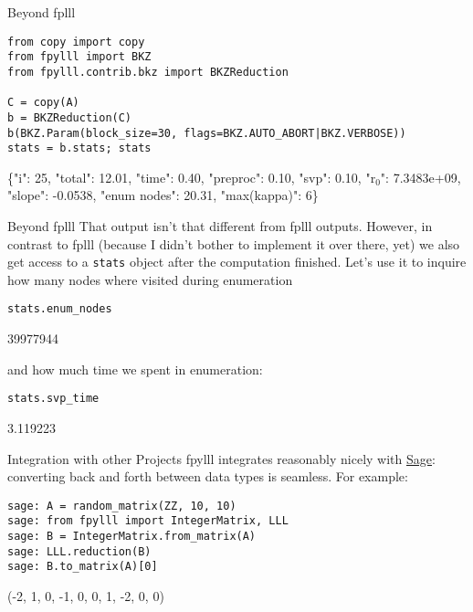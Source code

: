 \documentclass[presentation,smaller]{beamer}
\begin{document}
\begin{frame}[fragile,label={sec:orgheadline24}]{Beyond fplll}
 \lstset{language=Python,label= ,caption= ,captionpos=b,numbers=none}
\begin{lstlisting}
from copy import copy
from fpylll import BKZ
from fpylll.contrib.bkz import BKZReduction

C = copy(A)
b = BKZReduction(C)
b(BKZ.Param(block_size=30, flags=BKZ.AUTO_ABORT|BKZ.VERBOSE))
stats = b.stats; stats
\end{lstlisting}

\{"i":  25,  "total":     12.01,  "time":     0.40,  "preproc":     0.10,  "svp":     0.10,  "r\(_{\text{0}}\)": 7.3483e+09,  "slope": -0.0538,  "enum nodes": 20.31,  "max(kappa)":   6\}
\end{frame}

\begin{frame}[fragile,label={sec:orgheadline25}]{Beyond fplll}
 That output isn’t that different from \alert{fplll} outputs. However, in contrast to \alert{fplll} (because I didn’t bother to implement it over there, yet) we also get access to a \texttt{stats} object after the computation finished. Let’s use it to inquire how many nodes where visited during enumeration

\lstset{language=Python,label= ,caption= ,captionpos=b,numbers=none}
\begin{lstlisting}
stats.enum_nodes
\end{lstlisting}

39977944

and how much time we spent in enumeration:

\lstset{language=Python,label= ,caption= ,captionpos=b,numbers=none}
\begin{lstlisting}
stats.svp_time
\end{lstlisting}

3.119223
\end{frame}

\begin{frame}[fragile,label={sec:orgheadline26}]{Integration with other Projects}
 \alert{fpylll} integrates reasonably nicely with \href{http://sagemath.org}{Sage}: converting back and forth between data types is seamless. For example:

\lstset{language=sage,label= ,caption= ,captionpos=b,numbers=none}
\begin{lstlisting}
sage: A = random_matrix(ZZ, 10, 10)
sage: from fpylll import IntegerMatrix, LLL
sage: B = IntegerMatrix.from_matrix(A)
sage: LLL.reduction(B)
sage: B.to_matrix(A)[0]
\end{lstlisting}

(-2, 1, 0, -1, 0, 0, 1, -2, 0, 0)
\end{frame}
\end{document}
